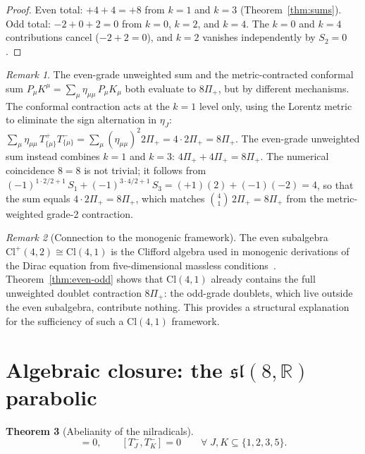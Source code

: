 \documentclass{birkjour}
\newtheorem{thm}{Theorem}[section]
\theoremstyle{definition}
\theoremstyle{remark}
\newtheorem{rem}[thm]{Remark}
\numberwithin{equation}{section}
\newcommand{\Cl}{\mathrm{Cl}}
\newcommand{\slR}{\mathfrak{sl}}
\newcommand{\R}{\mathbb{R}}
\providecommand{\rev}{{}}
\begin{document}
\begin{proof}
Even total: $+4+4=+8$ from $k=1$ and $k=3$
(Theorem~\ref{thm:sums}).
Odd total: $-2+0+2=0$ from $k=0$, $k=2$, and $k=4$.
The $k=0$ and $k=4$ contributions cancel
($-2+2=0$), and $k=2$ vanishes independently
by $S_2=0$.
\end{proof}

\begin{rem}\label{rem:8Pi-distinction}
The even-grade unweighted sum and the metric-contracted
conformal sum $P_\mu K^\mu=\sum_\mu\eta_{\mu\mu}\,P_\mu K_\mu$
both evaluate to $8\Pi_+$, but by different mechanisms.
The conformal contraction acts at the $k=1$ level only, using
the Lorentz metric to eliminate the sign alternation in $\eta_J$:
$\sum_\mu\eta_{\mu\mu}\,T^+_{\{\mu\}}T^-_{\{\mu\}}
=\sum_\mu(\eta_{\mu\mu})^2 2\Pi_+=4 \cdot 2\Pi_+=8\Pi_+$.
The even-grade unweighted sum instead combines $k=1$ and $k=3$:
$4\Pi_++4\Pi_+=8\Pi_+$.
The numerical coincidence $8=8$ is not trivial; it follows from
$(-1)^{1\cdot2/2+1}\,S_1+(-1)^{3\cdot4/2+1}\,S_3
=(+1)(2)+(-1)(-2)=4$, so
that the sum equals $4\cdot 2\Pi_+=8\Pi_+$,
which matches $\binom{4}{1} \,  2\Pi_+=8\Pi_+$ from the
metric-weighted grade-2 contraction.
\end{rem}

\begin{rem}[Connection to the monogenic framework]
\label{rem:monogenic}
The even subalgebra $\Cl^+(4,2)\cong\Cl(4,1)$ is the
Clifford algebra used in \rev{monogenic derivations} of the
Dirac equation from five-dimensional massless
conditions~\cite{Almeida2006}.
Theorem~\ref{thm:even-odd} shows that $\Cl(4,1)$
already contains the full unweighted doublet contraction
$8\Pi_+$: the odd-grade doublets, which live outside
the even subalgebra, contribute nothing.
This provides a structural explanation for the sufficiency
of \rev{such a} $\Cl(4,1)$ framework.
\end{rem}


\section{Algebraic closure: the $\slR(8,\R)$ parabolic}\label{sec:algebra}

\begin{thm}[Abelianity of the nilradicals]
\label{thm:abelian}
\begin{equation}
[T^+_J,T^+_K]=0,\qquad
[T^-_J,T^-_K]=0
\qquad\forall\;J,K\subseteq\{1,2,3,5\}.
\end{equation}
\end{thm}
\end{document}

